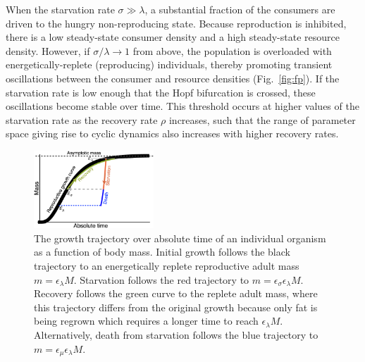 \documentclass{pnastwo}
\begin{document}
\begin{article}
When the starvation rate $\sigma\gg\lambda$, a substantial fraction of the consumers are driven to the hungry non-reproducing state.
Because reproduction is inhibited, there is a low steady-state consumer density and a high steady-state resource density.
However, if $\sigma/\lambda\to 1$ from above, the population is overloaded with energetically-replete (reproducing) individuals, thereby promoting transient oscillations between the consumer and resource densities (Fig.~\ref{fig:fp}).
If the starvation rate is low enough that the Hopf bifurcation is crossed, these oscillations become stable over time.
This threshold occurs at higher values of the starvation rate as the recovery rate $\rho$ increases, such that the range of parameter space giving rise to cyclic dynamics also increases with higher recovery rates.
\\

\begin{figure}
\centering
\includegraphics[width=0.4\textwidth]{Growth-trajectory-diagram.eps}
\caption{\small{ The growth trajectory over absolute time of an individual organism as a function of body mass.  
Initial growth follows the black trajectory to an energetically replete reproductive adult mass $m=\epsilon_\lambda M$. %
Starvation follows the red trajectory to $m = \epsilon_\sigma \epsilon_\lambda  M$. 
Recovery follows the green curve to the replete adult mass, where this trajectory differs from the original growth because only fat is being regrown which requires a longer time to reach $\epsilon_\lambda M$. %
Alternatively, death from starvation follows the blue trajectory to $m=\epsilon_\mu \epsilon_\lambda  M$.}}
\label{fig:growth}
\end{figure}


\end{article}
\end{document}
